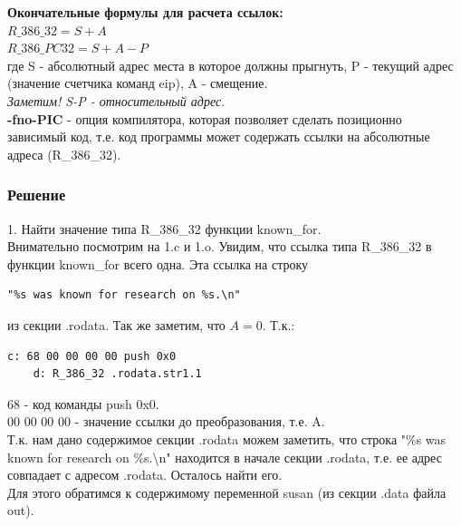 \documentclass[12pt, letterpaper]{article}
\begin{document}
\textbf{Окончательные формулы для расчета ссылок:}\\
$R\_386\_32=S+A$\\
$R\_386\_PC32=S+A-P$\\
где S - абсолютный адрес места в которое должны прыгнуть, P - текущий адрес (значение счетчика команд eip), A - смещение.\\
\textit{Заметим! S-P - относительный адрес}.\\

\textbf{-fno-PIC} - опция компилятора, которая позволяет сделать позиционно зависимый код, т.е. код программы может содержать ссылки на абсолютные адреса (R\_386\_32). \\

\subsubsection{Решение}
1. Найти значение типа R\_386\_32 функции known\_for.\\
Внимательно посмотрим на 1.c и 1.o. Увидим, что ссылка типа R\_386\_32 в функции known\_for всего одна. Эта ссылка на строку 
\begin{verbatim}
"%s was known for research on %s.\n" 
\end{verbatim}
из секции .rodata. Так же заметим, что $A=0$. Т.к.:
\begin{verbatim}
c: 68 00 00 00 00 push 0x0
    d: R_386_32 .rodata.str1.1
\end{verbatim}
68 - код команды push 0x0.\\ 00 00 00 00 - значение ссылки до преобразования, т.е. A.\\
Т.к. нам дано содержимое секции .rodata можем заметить, что строка "\%s was known for research on \%s.\textbackslash n" находится в начале секции .rodata, т.е. ее адрес совпадает с адресом .rodata. Осталось найти его.\\

Для этого обратимся к содержимому переменной susan (из секции .data файла out).\\
\end{document}
